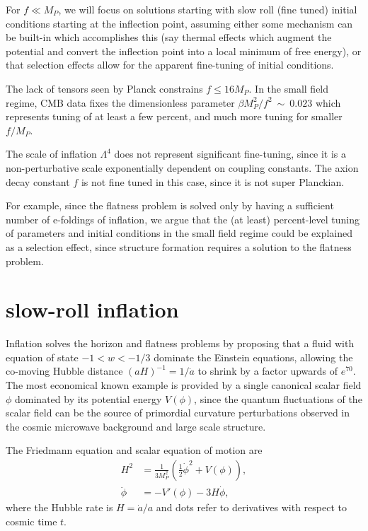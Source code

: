 \documentclass[aps,amsfonts,amsmath,prd,preprint,nofootinbib]{revtex4}
\newcommand{\Mp}{{M_{P}}}
\newcommand{\MMp}{{M_P^2}}
\begin{document}
For $f \ll \Mp$, we will focus on solutions starting with slow roll (fine tuned) initial conditions starting at the inflection point, assuming either some mechanism can be built-in which accomplishes
this (say thermal effects which augment the potential and convert the inflection point into a local minimum of free energy), or that selection effects allow for the apparent fine-tuning of
initial conditions.

The lack of tensors seen by Planck constrains $f \leq 16\Mp$.  In the small field regime, CMB data fixes the dimensionless parameter $\beta \MMp/f^2~\sim~0.023$ which represents tuning of at least a few percent, and much more tuning for smaller $f/\Mp$.  

The scale of inflation $\Lambda^4$ does not represent significant fine-tuning, since it is a non-perturbative scale exponentially dependent on coupling constants.  
The axion decay constant $f$ is not fine tuned in this case, since it is not super Planckian.


For example, since the flatness problem is solved only by having a sufficient number of e-foldings of inflation, we argue that the (at least) percent-level tuning of parameters and initial conditions in
the small field regime could be explained as a selection effect, since structure formation requires a solution to the flatness problem.





\section{slow-roll inflation}
Inflation solves the horizon and flatness problems by proposing that a fluid with equation of state $-1< w < -1/3$ dominate the Einstein equations, allowing the co-moving Hubble distance $(a H)^{-1} = 1/\dot a$ to
shrink by a factor upwards of $e^{70}$. The most economical known example is provided by a single canonical scalar field $\phi$ dominated by its potential energy $V(\phi)$, since the quantum fluctuations of the scalar field can be the source of primordial curvature perturbations observed in the cosmic microwave background and large scale structure. 
 
The Friedmann equation and scalar equation of motion are
\begin{align}
H^2 &= \frac{1}{3\MMp}\left(\tfrac{1}{2}\dot\phi^2 + V(\phi)\right),\\
\ddot \phi &= -V'(\phi) - 3 H \dot \phi,\label{eq:scalareom}
\end{align}
where the Hubble rate is $H = \dot a/a$ and dots refer to derivatives with respect to cosmic time $t$.  
\end{document}
